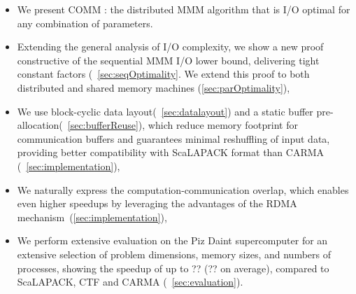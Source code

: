 \documentclass[sigplan,review,anonymous]{acmart}\settopmatter{printfolios=true,printccs=false,printacmref=false}
\newcommand\mac[1]{\textcolor{red}{[Mac: #1]}}
\begin{document}
\begin{itemize}[leftmargin=1em]
%
\item We present COMM : the distributed MMM algorithm that is I/O optimal for 
any combination of parameters.
%
%
\item Extending the general analysis of I/O complexity, we
show a new proof constructive of the sequential MMM I/O lower bound,
delivering tight constant factors (~\cref{sec:seqOptimality}. We extend this 
proof to both distributed and shared memory machines (\cref{sec:parOptimality}),
%
%
\item We use block-cyclic data layout(~\cref{sec:datalayout}) and a static 
buffer pre-allocation(~\cref{sec:bufferReuse}), which reduce
memory footprint for communication buffers and guarantees minimal reshuffling
of input data, providing better compatibility with ScaLAPACK format than CARMA
(~\cref{sec:implementation}),
%
\item We naturally express the computation-communication overlap, which enables 
even higher speedups by
leveraging the advantages of the RDMA mechanism~(\cref{sec:implementation}),
%
\item We perform extensive evaluation on the Piz Daint supercomputer for an 
extensive selection of problem
dimensions, memory sizes, and numbers of
processes, showing the speedup of up to ?? (?? on average), compared to 
ScaLAPACK, CTF and CARMA (~\cref{sec:evaluation}).
%
\end{itemize}

%
\end{document}

